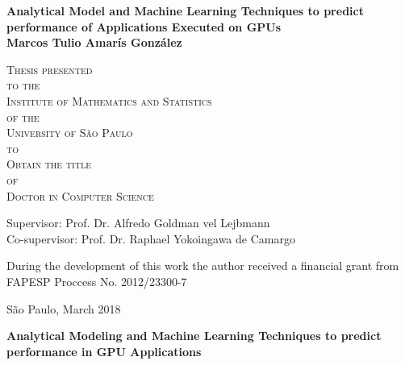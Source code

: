 \documentclass[openany,11pt,twoside,a4paper]{book}
\begin{document}
\frontmatter 
\fancyhead[RO]{{\footnotesize\rightmark}\hspace{2em}\thepage}
\setcounter{tocdepth}{2}
\fancyhead[LE]{\thepage\hspace{2em}\footnotesize{\leftmark}}
\fancyhead[RE,LO]{}
\fancyhead[RO]{{\footnotesize\rightmark}\hspace{2em}\thepage}

\onehalfspacing  %

\thispagestyle{empty}
\begin{center}
    \vspace*{2.5cm}
    \bf
    \textbf{\Large{Analytical Model and Machine Learning Techniques to predict performance of Applications Executed on GPUs}}\\
    
    \vspace*{2.5cm}
    \Large{Marcos Tulio Amar\'{i}s Gonz\'{a}lez}
    
    \vskip 2cm
    \textsc{
    Thesis presented\\[-0.25cm] 
    to the\\[-0.25cm]
    Institute of Mathematics and Statistics\\[-0.25cm]
    of the\\[-0.25cm]
    University of S\~{a}o Paulo\\[-0.25cm]
    to\\[-0.25cm]
    Obtain the title\\[-0.25cm]
    of\\[-0.25cm]
    Doctor in Computer Science}
    
    \vskip 1.5cm    
    Supervisor: Prof. Dr. Alfredo Goldman vel Lejbmann\\
    Co-supervisor: Prof. Dr. Raphael Yokoingawa de Camargo
    
    \vskip 1.5cm
    \normalsize{During the development of this work the author received 
a financial grant from FAPESP Proccess No. 2012/23300-7}
    
    \vskip 1.5cm
    \normalsize{S\~{a}o Paulo, March 2018}
\end{center}

%
%
%
\newpage
\thispagestyle{empty}
    \begin{center}
        \vspace*{2.3 cm}
        \textbf{\Large{Analytical Modeling and Machine Learning Techniques to predict performance in GPU Applications}}\\
        \vspace*{2 cm}
    \end{center}
\end{document}
